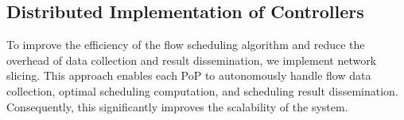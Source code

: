 \subsection{Distributed Implementation of Controllers}\label{sec:Network Slicing}
To improve the efficiency of the flow scheduling algorithm and reduce the overhead of data collection and result dissemination, we implement network slicing. This approach enables each PoP to autonomously handle flow data collection, optimal scheduling computation, and scheduling result dissemination. Consequently, this significantly improves the scalability of the system.


